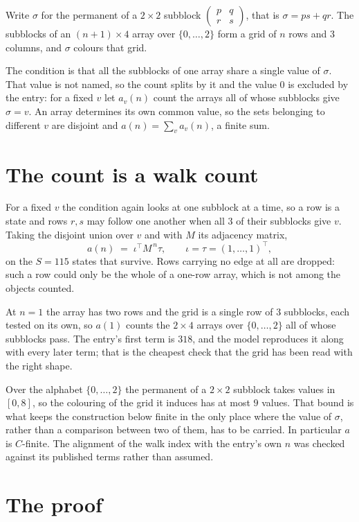 \documentclass[11pt,a4paper]{article}
\theoremstyle{plain}
\theoremstyle{definition}
\begin{document}
Write $\sigma$ for the permanent of a $2\times2$ subblock
$\begin{pmatrix}p&q\\r&s\end{pmatrix}$, that is $\sigma=ps+qr$. The subblocks of an
$(n+1)\times4$ array over $\{0,\dots,2\}$ form a grid of $n$ rows and $3$
columns, and $\sigma$ colours that grid.

The condition is that all the subblocks of one array share a single value of $\sigma$. That
value is not named, so the count splits by it and the value $0$ is excluded by the entry: for a fixed $v$ let $a_v(n)$ count the
arrays all of whose subblocks give $\sigma=v$. An array determines its own common value, so
the sets belonging to different $v$ are disjoint and $a(n)=\sum_v a_v(n)$, a finite sum.

\section{The count is a walk count}

For a fixed $v$ the condition again looks at one subblock at a time, so a
row is a state and rows $r,s$ may follow one another when all $3$ of their subblocks give
$v$. Taking the disjoint union over $v$ and with $M$ its adjacency matrix,
\[
a(n)\;=\;\iota^{\!\top}M^{\,n}\tau,\qquad\iota=\tau=(1,\dots,1)^{\!\top},
\]
on the $S=115$ states that survive. Rows carrying no edge at all are dropped: such a row could
only be the whole of a one-row array, which is not among the objects counted.

At $n=1$ the array has two rows and the grid is a single row of $3$
subblocks, each tested on its own, so $a(1)$ counts the
$2\times4$ arrays over $\{0,\dots,2\}$ all of whose subblocks pass. The entry's
first term is $318$, and the model reproduces it along with every later term; that is the
cheapest check that the grid has been read with the right shape.

Over the alphabet $\{0,\dots,2\}$ the permanent of a $2\times2$ subblock takes values in
$[0,8]$, so the colouring of the grid it induces has at most $9$ values.
That bound is what keeps the construction below finite in the only place where the value of
$\sigma$, rather than a comparison between two of them, has to be carried.
In particular $a$ is $C$-finite. The alignment of the walk index with the entry's own $n$ was
checked against its published terms rather than assumed.

\section{The proof}
\end{document}
